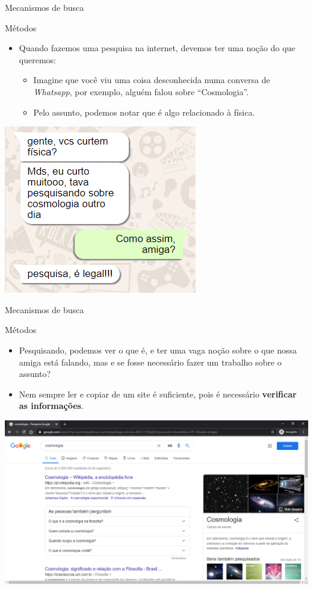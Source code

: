 \begin{frame}{Mecanismos de busca}
	\begin{block}{Métodos}
		\begin{itemize}
			\item Quando fazemos uma pesquisa na internet, devemos ter uma noção do que queremos:
			      \begin{itemize}
				      \item\normalsize Imagine que você viu uma coisa desconhecida numa conversa de \textit{Whatsapp}, por exemplo, alguém falou sobre ``Cosmologia''.
				      \item\normalsize Pelo assunto, podemos notar que é algo relacionado à física.
			      \end{itemize}
		\end{itemize}
	\end{block}

	\centering
	\includegraphics[width=0.45\linewidth]{Figuras/Ch03/fig7.4}
\end{frame}


\begin{frame}{Mecanismos de busca}
	\begin{block}{Métodos}
		\begin{itemize}
			\item Pesquisando, podemos ver o que é, e ter uma vaga noção sobre o que nossa amiga está falando, mas e se fosse necessário fazer um trabalho sobre o assunto?
			\item Nem sempre ler e copiar de um site é suficiente, pois é necessário \textbf{verificar as informações}.
		\end{itemize}
	\end{block}

	\centering
	\includegraphics[width=0.7\linewidth]{Figuras/Ch03/fig7.5}
\end{frame}


